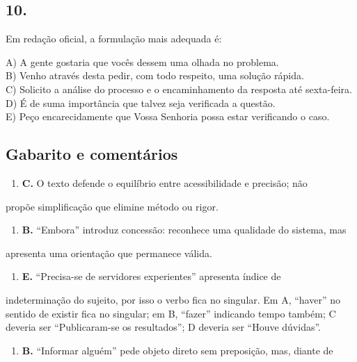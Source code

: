 \documentclass[11pt,a4paper]{article}
\begin{document}
\subsection*{10.}

Em redação oficial, a formulação mais adequada é:

A) A gente gostaria que vocês dessem uma olhada no problema. \\ B) Venho através desta pedir, com todo respeito, uma solução rápida. \\ C) Solicito a análise do processo e o encaminhamento da resposta até sexta-feira. \\ D) É de suma importância que talvez seja verificada a questão. \\ E) Peço encarecidamente que Vossa Senhoria possa estar verificando o caso.

\subsection*{Gabarito e comentários}

\begin{enumerate}
  \item \textbf{C.} O texto defende o equilíbrio entre acessibilidade e precisão; não
\end{enumerate}

propõe simplificação que elimine método ou rigor.

\begin{enumerate}
  \item \textbf{B.} “Embora” introduz concessão: reconhece uma qualidade do sistema, mas
\end{enumerate}

apresenta uma orientação que permanece válida.

\begin{enumerate}
  \item \textbf{E.} “Precisa-se de servidores experientes” apresenta índice de
\end{enumerate}

indeterminação do sujeito, por isso o verbo fica no singular. Em A, “haver” no sentido de existir fica no singular; em B, “fazer” indicando tempo também; C deveria ser “Publicaram-se os resultados”; D deveria ser “Houve dúvidas”.

\begin{enumerate}
  \item \textbf{B.} “Informar alguém” pede objeto direto sem preposição, mas, diante de
\end{enumerate}
\end{document}
